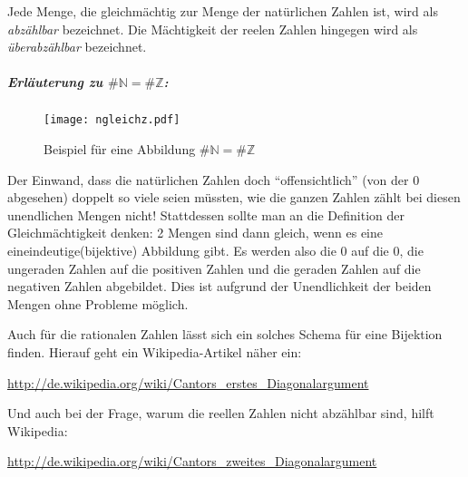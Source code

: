 Jede Menge, die gleichmächtig zur Menge der natürlichen Zahlen ist, wird als \emph{abzählbar} bezeichnet.
Die Mächtigkeit der reelen Zahlen hingegen wird als \emph{überabzählbar} bezeichnet.
\subparagraph{Erläuterung zu \(\#{\mathbb N} = \#{\mathbb Z}\):}
\begin{figure}[b]
  \centering
  \caption{Beispiel für eine Abbildung \(\#{\mathbb N} = \#{\mathbb Z}\)}
  \texttt{[image: ngleichz.pdf]}
\end{figure}
Der Einwand, dass die natürlichen Zahlen doch ``offensichtlich'' (von der 0
abgesehen) doppelt so viele seien müssten, wie die ganzen Zahlen zählt
bei diesen unendlichen Mengen nicht! Stattdessen sollte man an die
Definition der Gleichmächtigkeit denken: 2 Mengen sind dann gleich,
wenn es eine eineindeutige(bijektive) Abbildung gibt.
Es werden also die 0 auf die 0, die ungeraden Zahlen auf die positiven
Zahlen und die geraden Zahlen auf die negativen Zahlen abgebildet.
Dies ist aufgrund der Unendlichkeit der beiden Mengen ohne Probleme
möglich.

Auch für die rationalen Zahlen lässt sich ein solches Schema für eine Bijektion finden.
Hierauf geht ein Wikipedia-Artikel näher ein:

\url{http://de.wikipedia.org/wiki/Cantors_erstes_Diagonalargument}

Und auch bei der Frage, warum die reellen Zahlen nicht abzählbar sind, hilft Wikipedia:

\url{http://de.wikipedia.org/wiki/Cantors_zweites_Diagonalargument}

